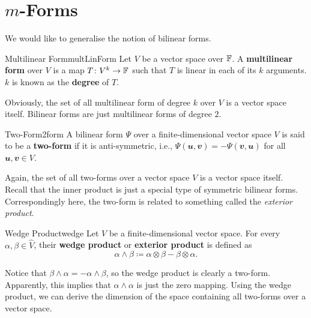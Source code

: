 \documentclass[math, code]{amznotes}
\theoremstyle{remark}
\begin{document}
\section{$m$-Forms}
We would like to generalise the notion of bilinear forms.
\begin{dfnbox}{Multilinear Form}{multLinForm}
    Let $V$ be a vector space over $\mathbb{F}$. A {\color{red} \textbf{multilinear form}} over $V$ is a map $T \colon V^k \to \mathbb{F}$ such that $T$ is linear in each of its $k$ arguments. $k$ is known as the {\color{red} \textbf{degree}} of $T$.
\end{dfnbox}
Obviously, the set of all multilinear form of degree $k$ over $V$ is a vector space itself. Bilinear forms are just multilinear forms of degree $2$. 
\begin{dfnbox}{Two-Form}{2form}
    A bilinear form $\Psi$ over a finite-dimensional vector space $V$ is said to be a {\color{red} \textbf{two-form}} if it is anti-symmetric, i.e., $\Psi(\mathbfit{u}, \mathbfit{v}) = -\Psi(\mathbfit{v}, \mathbfit{u})$ for all $\mathbfit{u}, \mathbfit{v} \in V$.
\end{dfnbox}
Again, the set of all two-forms over a vector space $V$ is a vector space itself. Recall that the inner product is just a special type of symmetric bilinear forms. Correspondingly here, the two-form is related to something called the \textit{exterior product}.
\begin{dfnbox}{Wedge Product}{wedge}
    Let $V$ be a finite-dimensional vector space. For every $\alpha, \beta \in \widehat{V}$, their {\color{red} \textbf{wedge product}} or {\color{red} \textbf{exterior product}} is defined as 
    \begin{equation*}
        \alpha \wedge \beta \coloneqq \alpha \otimes \beta - \beta \otimes \alpha.
    \end{equation*}
\end{dfnbox}
Notice that $\beta \wedge \alpha = -\alpha \wedge \beta$, so the wedge product is clearly a two-form. Apparently, this implies that $\alpha \wedge \alpha$ is just the zero mapping. Using the wedge product, we can derive the dimension of the space containing all two-forms over a vector space.
\end{document}
